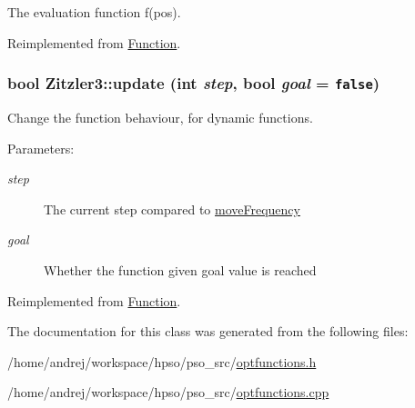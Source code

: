 The evaluation function f(pos). 



Reimplemented from \hyperlink{classFunction_159260a1fc3afa8932491e4057b6b844}{Function}.\hypertarget{classZitzler3_6beb6eca13774e5dd172f2a7d3f1f76f}{
\subsubsection{\setlength{\rightskip}{0pt plus 5cm}bool Zitzler3::update (int {\em step}, \/  bool {\em goal} = {\tt false})}}
\label{classZitzler3_6beb6eca13774e5dd172f2a7d3f1f76f}


Change the function behaviour, for dynamic functions. 

\begin{Desc}
\item[Parameters: ]\par
\begin{description}
\item[{\em 
step}]The current step compared to \hyperlink{classFunction_323cbb2de44582df3b9981e6c3416980}{moveFrequency} \item[{\em 
goal}]Whether the function given goal value is reached \end{description}
\end{Desc}


Reimplemented from \hyperlink{classFunction_31bae656cf84683529a1a8c19c9f0a67}{Function}.

The documentation for this class was generated from the following files:\begin{CompactItemize}
\item 
/home/andrej/workspace/hpso/pso\_\-src/\hyperlink{optfunctions_8h}{optfunctions.h}\item 
/home/andrej/workspace/hpso/pso\_\-src/\hyperlink{optfunctions_8cpp}{optfunctions.cpp}\end{CompactItemize}

